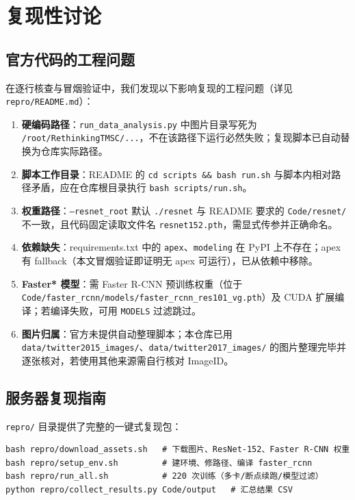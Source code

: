 \documentclass[11pt]{ctexart}
\begin{document}
\section{复现性讨论}

\subsection{官方代码的工程问题}

在逐行核查与冒烟验证中，我们发现以下影响复现的工程问题（详见 \texttt{repro/README.md}）：
\begin{enumerate}
  \item \textbf{硬编码路径}：\texttt{run\_data\_analysis.py} 中图片目录写死为 \texttt{/root/RethinkingTMSC/...}，不在该路径下运行必然失败；复现脚本已自动替换为仓库实际路径。
  \item \textbf{脚本工作目录}：README 的 \texttt{cd scripts \&\& bash run.sh} 与脚本内相对路径矛盾，应在仓库根目录执行 \texttt{bash scripts/run.sh}。
  \item \textbf{权重路径}：\texttt{--resnet\_root} 默认 \texttt{./resnet} 与 README 要求的 \texttt{Code/resnet/} 不一致，且代码固定读取文件名 \texttt{resnet152.pth}，需显式传参并正确命名。
  \item \textbf{依赖缺失}：requirements.txt 中的 \texttt{apex}、\texttt{modeling} 在 PyPI 上不存在；apex 有 fallback（本文冒烟验证即证明无 apex 可运行），已从依赖中移除。
  \item \textbf{Faster* 模型}：需 Faster R-CNN 预训练权重（位于 \texttt{Code/faster\_rcnn/models/}\allowbreak\texttt{faster\_rcnn\_res101\_vg.pth}）及 CUDA 扩展编译；若编译失败，可用 \texttt{MODELS} 过滤跳过。
  \item \textbf{图片归属}：官方未提供自动整理脚本；本仓库已用 \texttt{data/twitter2015\_images/}、\allowbreak\texttt{data/twitter2017\_images/} 的图片整理完毕并逐张核对，若使用其他来源需自行核对 ImageID。
\end{enumerate}

\subsection{服务器复现指南}

\texttt{repro/} 目录提供了完整的一键式复现包：
\begin{verbatim}
bash repro/download_assets.sh   # 下载图片、ResNet-152、Faster R-CNN 权重
bash repro/setup_env.sh         # 建环境、修路径、编译 faster_rcnn
bash repro/run_all.sh           # 220 次训练（多卡/断点续跑/模型过滤）
python repro/collect_results.py Code/output   # 汇总结果 CSV
\end{verbatim}
\end{document}
